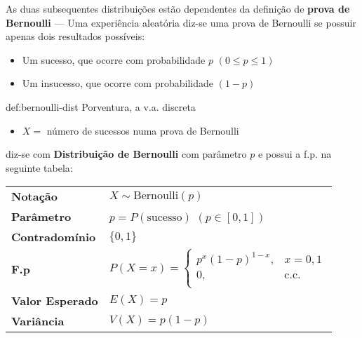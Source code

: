 \noindent As duas subsequentes distribuições estão dependentes da definição de \textbf{prova de Bernoulli} --- Uma experiência aleatória diz-se uma prova de Bernoulli se possuir apenas dois resultados possíveis:
\begin{itemize}
    \item Um sucesso, que ocorre com probabilidade $p$ $(0 \leq p \leq 1)$
    \item Um insucesso, que ocorre com probabilidade $(1 - p)$
\end{itemize}

\vspace{-0.85em}
\begin{theo}{def:bernoulli-dist}\label{def:bernoulli-dist}
    \noindent Porventura, a v.a. discreta
    \begin{itemize}
        \item $X =$ número de sucessos numa prova de Bernoulli
    \end{itemize}
    
    \noindent diz-se com \textbf{Distribuição de Bernoulli} com parâmetro $p$ e possui a f.p. na seguinte tabela:
    
    \begin{center}
    \begin{tabular}{p{4cm}p{8cm}}
    \toprule
    \textbf{Notação} & $X \sim \text{Bernoulli}(p)$\\
    \addlinespace
    \textbf{Parâmetro} & $p = P(\text{sucesso})$ $(p \in [0,1])$\\
    \addlinespace
    \textbf{Contradomínio} & $\{0,1\}$\\
    \addlinespace
    \textbf{F.p} & $P(X = x)= \left\{
                                    \begin{array}{ll}
                                          p^x(1 - p)^{1-x}, & x = 0,1\\
                                           0, & \text{c.c.}\\
                                    \end{array} 
                              \right.$\\
    \addlinespace
    \textbf{Valor Esperado} & $E(X) = p$\\
    \addlinespace
    \textbf{Variância} & $V(X) = p(1-p)$\\
    \bottomrule
    \end{tabular}
    \end{center}

    \vspace{0.35em}
\end{theo}

